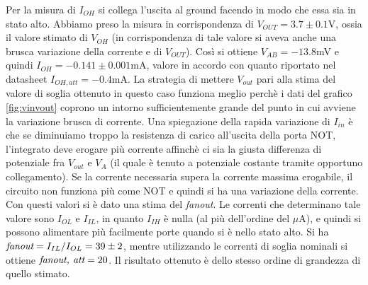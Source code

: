 \documentclass[10pt,a4paper]{article}
\begin{document}
Per la misura di $I_{OH}$ si collega l'uscita al ground facendo in modo che essa sia in stato alto.
Abbiamo preso la misura in corrispondenza di $V_{OUT}=3.7\pm0.1 $V, ossia il valore stimato di $V_{OH}$ (in corrispondenza di tale valore si aveva anche una brusca variazione della corrente e di $V_{OUT}$).
Così si ottiene $V_{AB}=-13.8$mV e quindi $I_{OH}=-0.141\pm0.001$mA, valore in accordo con quanto riportato nel datasheet $I_{OH,att}=-0.4$mA. La strategia di mettere $V_{out}$ pari alla stima del valore di soglia ottenuto in questo caso funziona meglio perchè i dati del grafico \ref{fig:vinvout} coprono un intorno sufficientemente grande del punto in cui avviene la variazione brusca di corrente.
Una spiegazione della rapida variazione di $I_{in}$ è che se diminuiamo troppo la resistenza di carico all'uscita della porta NOT, l'integrato deve erogare più corrente affinchè ci sia la giusta differenza di potenziale fra $V_{out}$ e $V_{A}$ (il quale è tenuto a potenziale costante tramite opportuno collegamento). Se la corrente necessaria supera la corrente massima erogabile, il circuito non funziona più come NOT e quindi si ha una variazione della corrente.  
Con questi valori si è dato una stima del \emph{fanout}.
Le correnti che determinano tale valore sono $I_{OL}$ e $I_{IL}$, in quanto $I_{IH}$ è nulla (al più dell'ordine del $\mu$A), e quindi si possono alimentare più facilmente porte quando si è nello stato alto.
Si ha $\emph{fanout}= I_{IL}/I_{OL}=39\pm 2$, mentre utilizzando le correnti di soglia nominali si ottiene $\emph{fanout, att}=20$. Il risultato ottenuto è dello stesso ordine di grandezza di quello stimato.
\end{document}
